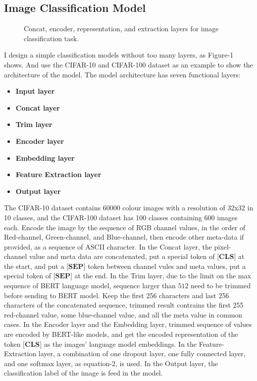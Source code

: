 \documentclass[review]{cvpr}
\begin{document}
\subsection{Image Classification Model}

\begin{figure*}
\begin{center}
\end{center}
   \caption{Concat, encoder, representation, and extraction layers for image classification task.}
\label{fig:short}
\end{figure*}

I design a simple classification models without too many layers, as Figure-1 shows.
And use the CIFAR-10 and CIFAR-100 dataset as an example to show the architecture of the model.
The model architecture has seven functional layers:

\begin{itemize}
\item {\bf Input layer}
\item {\bf Concat layer}
\item {\bf Trim layer}
\item {\bf Encoder layer}
\item {\bf Embedding layer}
\item {\bf Feature Extraction layer}
\item {\bf Output layer}
\end{itemize}

\par The CIFAR-10 dataset contains 60000 colour images with a resolution of 32x32 in 10 classes, and the CIFAR-100 dataset has 100 classes containing 600 images each.
Encode the image by the sequence of RGB channel values, in the order of Red-channel, Green-channel, and Blue-channel,
then encode other meta-data if provided, as a sequence of ASCII character.
In the Concat layer, the pixel-channel value and meta data are concatenated, put a special token of $\textbf{[CLS]}$ at the start,
and put a $\textbf{[SEP]}$ token between channel vules and meta values, put a special token of $\textbf{[SEP]}$ at the end.
In the Trim layer, due to the limit on the max sequence of BERT language model, sequence larger than $512$ need to be trimmed before sending to BERT model.
Keep the first 256 characters and last 256 characters of the concatenated sequence, trimmed result contrains the first 255 red-channel value,
some blue-channel value, and all the meta value in common cases.
In the Encoder layer and the Embedding layer, trimmed sequence of values are encoded by BERT-like models,
and get the encoded representation of the token $\textbf{[CLS]}$ as the images' language model embeddings.
In the Feature-Extraction layer, a combination of one dropout layer, one fully connected layer, and one softmax layer, as equation-2, is used.
In the Output layer, the classification label of the image is feed in the model.
\end{document}
